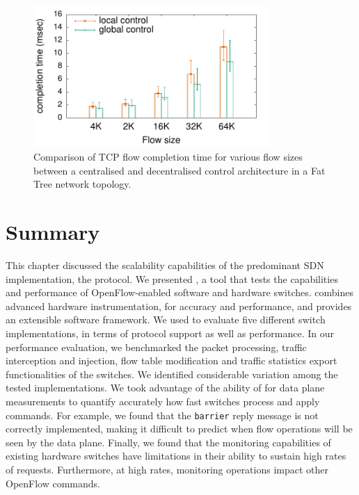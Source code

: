 \begin{figure}[h]
  \begin{center}
    \includegraphics[width=0.80\textwidth]{Chapter1/Chapter1Figs/sdnsim-use-case}
  \end{center}
  \caption[Hierarchical control evaluation result]{Comparison of TCP flow completion time for various flow sizes between
    a centralised and decentralised control architecture in a Fat Tree
    network topology.}
  \label{fig:sdnsim-use-case-result}
\end{figure}


\section{Summary} \label{sec:modeling:summary}



This chapter discussed the scalability capabilities of the predominant SDN
implementation, the \of protocol.  We presented \oflops, a tool that tests the
capabilities and performance of OpenFlow-enabled software and hardware switches.
\oflops combines advanced hardware instrumentation, for accuracy and
performance, and provides an extensible software framework. We used \oflops to
evaluate five different \of switch implementations, in terms of \of
protocol support as well as performance.  In our performance evaluation, we
benchmarked the packet processing, traffic interception and injection, flow table
modification and traffic statistics export functionalities of the switches.  We
identified considerable variation among the tested \of implementations.  We took
advantage of the ability of \oflops for data plane measurements to quantify
accurately how fast switches process and apply \of commands.  For example, we
found that the \texttt{barrier} reply message is not correctly implemented,
making it difficult to predict when flow operations will be seen by the data
plane.  Finally, we found that the monitoring capabilities of existing hardware
switches have limitations in their ability to sustain high rates of requests.
Furthermore, at high rates, monitoring operations impact other OpenFlow commands.

